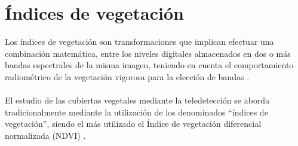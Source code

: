  
\section{\'Indices de vegetaci\'on}
Los \'indices de vegetaci\'on son transformaciones que implican efectuar una combinaci\'on matem\'atica, entre los niveles digitales almacenados en dos o m\'as bandas espectrales de la misma imagen, teniendo en cuenta el comportamiento radiom\'etrico de la vegetaci\'on vigorosa para la elecci\'on de bandas \cite{speranza2005potencialidad}. \\~\\
El estudio de las cubiertas vegetales mediante la teledetecci\'on se aborda tradicionalmente mediante la utilización de los denominados “índices de vegetaci\'on”, siendo el m\'as utilizado el \'Indice de vegetaci\'on diferencial normalizada (NDVI) \cite{sader2000estimacion}.

